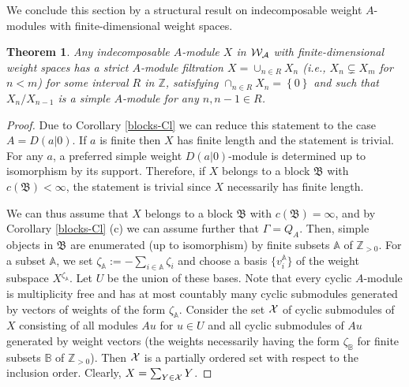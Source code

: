\documentclass[12pt]{amsart}
\makeatletter
\def\mathcal{\cal}
\def\@putname#1#2#3#4{\def\@@ref{#3}\let\old@bf\bf
        \def\bf##1{\old@bf\if?\noexpand##1?{#4}\else##1\fi}%
	#1{#2}%
        \let\bf\old@bf}
\def\@putname#1#2#3#4{\def\@@ref{#3}\let\old@bf\bf	%
	\let\old@reset@font\reset@font			%
        \def\bf##1{\old@bf\if?\noexpand##1?{#4}\else##1\fi}%
	\def\reset@font##1##2{\old@reset@font##1\if?\noexpand##2?{#4}\else##2\fi}#1{#2}%
        \let\bf\old@bf\let\reset@font\old@reset@font}
\let\my@ref=\ref
\def\ref#1{\@putname\my@ref{#1}{#1}{\tiny\rm\@@ref}}
\theoremstyle{plain} %
\numberwithin{equation}{section}
\theoremstyle{definition}
\theoremstyle{remark}
\theoremstyle{plain} %
\newtheorem{theorem}[definition]{Theorem}
\makeatother
\begin{document}
  We conclude this section by a structural result on indecomposable weight $A$-modules with finite-dimensional weight spaces.  
                \begin{theorem}\label{filtration} Any indecomposable  $A$-module $X$ in $\mathcal W_A$ with finite-dimensional weight spaces has a strict $A$-module filtration $X =\cup_{n\in R}X_n$ (i.e.,  $X_n \subsetneq X_m$ for  $n <m$)  for some interval $R$ in $\mathbb Z$, satisfying $\cap_{n\in R}X_n = \left\{0 \right\}$ and such that  $X_n/X_{n-1}$ is a simple $A$-module for any $n,n-1 \in R$. 
                \end{theorem}
                \begin{proof} Due to Corollary \ref{blocks-Cl} we can reduce this statement to the case $A=D(a|0)$. If $a$ is finite then $X$  has finite length and the statement
                  is trivial. For any $a$, a preferred simple weight $D(a|0)$-module is  determined up to isomorphism by its support. Therefore, if  $X$ belongs to a block $\mathfrak B$ with $c(\mathfrak B)<\infty$, the statement is trivial since $X$ necessarily has finite length. 
                  
             We can thus assume that $X$ belongs to a block $\mathfrak B$ with $c(\mathfrak B)=\infty$, and by {Corollary  \ref{blocks-Cl} (c)} we can assume further that
                  $\Gamma=Q_{A}$.
                  Then, simple objects in $\mathfrak B$ are enumerated (up to isomorphism) by finite subsets $\mathbb A$ of $\mathbb Z_{>0}$. For a subset $\mathbb A$, we set $\zeta_{\mathbb A}:=-\sum_{i\in \mathbb A}\zeta_{i}$
                  and choose a basis $\{v_i^{\mathbb A}\}$ of the weight subspace $X^{\zeta_{\mathbb A}}$. Let $U$ be the union of these bases. Note that every cyclic  $A$-module is multiplicity free and
                  has at most countably many cyclic submodules generated by vectors of weights of the form $\zeta_{\mathbb A}$. Consider the set $\mathcal X$ 
                  of cyclic submodules of $X$ consisting of all modules $Au$ for $u\in U$ and all cyclic submodules of $Au$ generated by weight vectors (the weights necessarily having
                   the form $\zeta_{\mathbb B}$ for finite subsets ${\mathbb B}$ of $\mathbb Z_{>0}$). Then $\mathcal X$ is a partially ordered set with respect to the inclusion order.
              Clearly, $X=\sum_{Y\in \mathcal X}Y$.
         

\end{proof}
\end{document}
